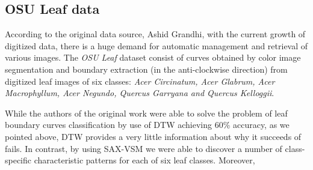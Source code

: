 \documentclass{llncs}
\begin{document}
\subsection{OSU Leaf data}
According to the original data source, Ashid Grandhi, with the current growth of digitized data,
there is a huge demand for automatic management and retrieval of various images. The \textit{OSU
Leaf} dataset consist of curves obtained by color image segmentation and boundary extraction (in the
anti-clockwise direction) from digitized leaf images of six classes: \textit{Acer Circinatum, Acer
Glabrum, Acer Macrophyllum, Acer Negundo, Quercus Garryana and Quercus Kelloggii}.

While the authors of the original work were able to solve the problem of leaf boundary curves
classification by use of DTW achieving 60\% accuracy, as we pointed above, DTW provides a very
little information about why it succeeds of fails. In contrast, by using SAX-VSM we were able to
discover a number of class-specific characteristic patterns for each of six leaf classes. Moreover, 
\end{document}
